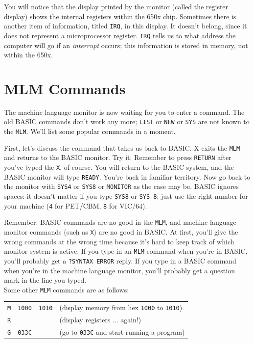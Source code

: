 \documentclass[11pt,a4paper,titlepage]{memoir}
\begin{document}
You will notice that the display printed by the monitor (called the register
display) shows the internal registers within the 650x chip. Sometimes there
is another item of information, titled \texttt{IRQ}, in this display. It doesn't belong,
since it does not represent a microprocessor register. \texttt{IRQ} tells us to what
address the computer will go if an \emph{interrupt} occurs; this information is
stored in memory, not within the 650x.
\section{MLM Commands}
The machine language monitor is now waiting for you to enter a command.
The old BASIC commands don't work any more; \texttt{LIST} or \texttt{NEW} or \texttt{SYS}
are not known to the \texttt{MLM}. We'll list some popular commands in a moment.

First, let's discuss the command that takes us back to BASIC.
X exits the \texttt{MLM} and returns to the BASIC monitor. Try it. Remember
to press \texttt{RETURN} after you've typed the \texttt{X}, of course. You will return to
the BASIC system, and the BASIC monitor will type \texttt{READY}. You're back
in familiar territory. Now go back to the monitor with \texttt{SYS4} or \texttt{SYS8} or
\texttt{MONITOR} as the case may be. BASIC ignores spaces: it doesn't matter
if you type \texttt{SYS8} or \texttt{SYS 8}; just use the right number for your machine
(\texttt{4} for PET/CBM, \texttt{8} for VIC/64).

Remember: BASIC commands are no good in the \texttt{MLM}, and machine
language monitor commands (such as \texttt{X}) are no good in BASIC. At first,
you'll give the wrong commands at the wrong time because it's hard to
keep track of which monitor system is active. If you type in an \texttt{MLM}
command when you're in BASIC, you'll probably get a \texttt{?SYNTAX ERROR}
reply. If you type in a BASIC command when you're in the machine language monitor, you'll probably get a question mark in the line you typed.\\

Some other \texttt{MLM} commands are as follows:

\begin{tabular}{llll}
	\texttt{M} & \texttt{1000} & \texttt{1010} & (display memory from hex \texttt{1000} to
	\texttt{1010}) \\
	\texttt{R} &  &  & (display registers ... again!) \\
	\texttt{G} & \texttt{033C} &  & (go to \texttt{033C} and start running a
	program) \\
\end{tabular}\\
\end{document}

